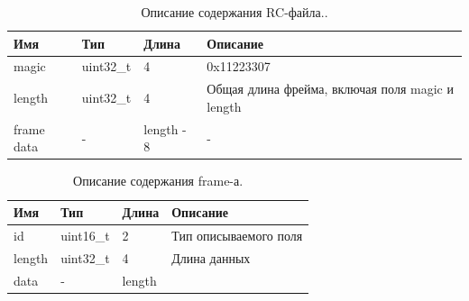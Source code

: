\documentclass[specification,annotation,times]{itmo-student-thesis}
\begin{document}
	\begin{table}[!ht]
		\caption{Описание содержания RC-файла..}\label{tb1:rc-type}
		\centering
		\begin{tabular}{|p{}|p{}|p{}|p{}|}\hline
			\textbf{Имя} & \textbf{Тип}	&\textbf{Длина}&	\textbf{Описание} \\\hline\hline
			magic	& uint32\_t&	4 &	0x11223307\\\hline
			length	&uint32\_t	&4 &	Общая длина фрейма, включая поля magic и length\\\hline
			frame data&	- &	length - 8	 & -\\\hline
		\end{tabular}
	\end{table}
	
	\begin{table}[!ht]
		\caption{Описание содержания frame-а.}\label{tb1:frame-type}
		\centering
		\begin{tabular}{|p{}|p{}|p{}|p{}|}\hline
			\textbf{Имя} & \textbf{Тип}	&\textbf{Длина}&	\textbf{Описание} \\\hline\hline
			id	&uint16\_t&	2 & Тип описываемого поля\\\hline
			length&	uint32\_t	&4	&Длина данных\\\hline
			data&	-	&length	 &\\\hline
			
		\end{tabular}
	\end{table}
	
\end{document}
